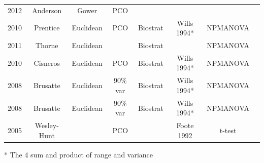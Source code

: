 \documentclass[12pt,letterpaper]{article}
\begin{document}
\begin{table}[ht]
\begin{tabular}{cccccccc}
    2012 & Anderson    & Gower     & PCO        &            &             &            & \citep{anderson2012using} \\
    2010 & Prentice    & Euclidean & PCO        & Biostrat   & Wills 1994* & NPMANOVA   & \citep{prentice2011} \\
    2011 & Thorne      & Euclidean &            & Biostrat   &             & NPMANOVA   & \citep{thorneresetting2011} \\
    2010 & Cisneros    & Euclidean & PCO        & Biostrat   & Wills 1994* & NPMANOVA   & \citep{cisneros2010} \\
    2008 & Brusatte    & Euclidean & 90\% var   & Biostrat   & Wills 1994* & NPMANOVA   & \citep{brusatte50} \\
    2008 & Brusatte    & Euclidean & 90\% var   & Biostrat   & Wills 1994* & NPMANOVA   & \citep{Brusatte12092008} \\
    2005 & Wesley-Hunt &           & PCO        &            & Foote 1992  & t-test     & \citep{Wesley-Hunt2005} \\
  \hline
\end{tabular}
\end{table}
* The 4 sum and product of range and variance
\end{document}
